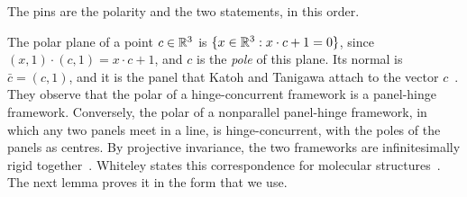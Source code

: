 \begin{fmlnote}
  The pins are the polarity and the two statements, in this order.
\end{fmlnote}

The polar plane of a point $c \in {\mathbb{R}}^3$ is
$\{x \in {\mathbb{R}}^3 : x \cdot c + 1 = 0\}$, since
$(x, 1) \cdot (c, 1) = x \cdot c + 1$, and $c$ is the \emph{pole} of
this plane. Its normal is $\bar c = (c, 1)$, and it is the panel that
Katoh and Tanigawa attach to the vector
$c$~\cite[\S5.1]{katohTanigawa2011}. They observe that the polar of a
hinge-concurrent framework is a panel-hinge framework. Conversely, the
polar of a nonparallel panel-hinge framework, in which any two panels
meet in a line, is hinge-concurrent, with the poles of the panels as
centres. By projective invariance, the two frameworks are
infinitesimally rigid together~\cite[pp.~650 and~671]{katohTanigawa2011}.
Whiteley states this correspondence for molecular
structures~\cite[Corollary~12]{whiteley1999}. The next lemma proves it
in the form that we use.

